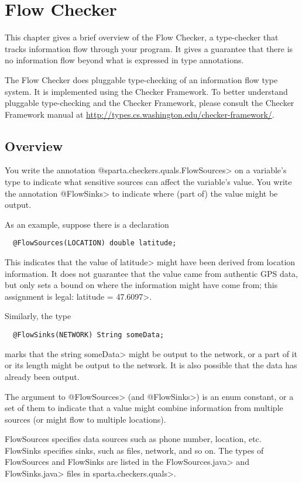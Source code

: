 \htmlhr
\chapter{Flow Checker\label{flow-checker}}

This chapter gives a brief overview of the Flow Checker, a type-checker that 
tracks information flow through your program.  It gives a guarantee that there
 is no information flow beyond what is expressed in type annotations.

The Flow Checker does pluggable type-checking of an information flow type
system.  It is implemented using the Checker Framework.  To better
understand pluggable type-checking and the Checker Framework, please
consult the Checker Framework manual at
\url{http://types.cs.washington.edu/checker-framework/}.  

\section{Overview}

You write the annotation \<@sparta.checkers.quals.FlowSources> on a variable's
type to indicate what sensitive sources can affect the variable's value.
You write the annotation \<@FlowSinks> to indicate where (part of) the
value might be output.

As an example, suppose there is a declaration
\begin{Verbatim}
  @FlowSources(LOCATION) double latitude;
\end{Verbatim}
\noindent
This indicates that the value of \<latitude> might have been derived from
location information.  It does not guarantee that the value came from
authentic GPS data, but only sets a bound on where the information might
have come from; this assignment is legal: \<latitude = 47.6097>.

Similarly, the type
\begin{Verbatim}
  @FlowSinks(NETWORK) String someData;
\end{Verbatim}
\noindent
marks that the string \<someData> might be output to the network, or a part
of it or its length might be output to the network.  It is also possible
that the data has already been output.

The argument to \<@FlowSources> (and \<@FlowSinks>) is an enum constant, or a
set of them to indicate that a value might combine information from
multiple sources (or might flow to multiple locations).

FlowSources specifies data sources such as phone number, location, 
etc.  FlowSinks specifies sinks, such as files, network, and so on.
The types of FlowSources and FlowSinks are listed in the
\<FlowSources.java> and \<FlowSinks.java> files in \<sparta.checkers.quals>.


